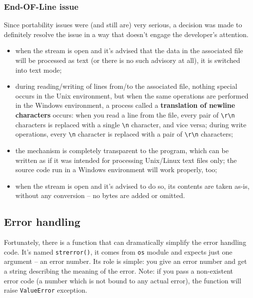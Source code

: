 \documentclass[11pt]{article}
\begin{document}
\subsubsection{End-OF-Line issue}
\label{sec:org79d77e9}
Since portability issues were (and still are) very serious, a decision
was made to definitely resolve the issue in a way that doesn’t engage
the developer’s attention.

\begin{itemize}
\item when the stream is open and it’s advised that the data in the
associated file will be processed as text (or there is no such
advisory at all), it is switched into text mode;

\item during reading/writing of lines from/to the associated file, nothing
special occurs in the Unix environment, but when the same operations
are performed in the Windows environment, a process called a
\textbf{translation of newline characters} occurs: when you read a line from
the file, every pair of \texttt{\textbackslash{}r\textbackslash{}n} characters is replaced with a single \texttt{\textbackslash{}n}
character, and vice versa; during write operations, every \texttt{\textbackslash{}n}
character is replaced with a pair of \texttt{\textbackslash{}r\textbackslash{}n} characters;

\item the mechanism is completely transparent to the program, which can be
written as if it was intended for processing Unix/Linux text files
only; the source code run in a Windows environment will work
properly, too;

\item when the stream is open and it’s advised to do so, its contents are
taken as-is, without any conversion – no bytes are added or omitted.
\end{itemize}




\newpage

\subsection{Error handling}
\label{sec:org736c5a4}
Fortunately, there is a function that can dramatically simplify the
error handling code. It’s named \texttt{strerror()}, it comes from \texttt{os} module
and expects just one argument – an error number.  Its role is simple:
you give an error number and get a string describing the meaning of
the error.  Note: if you pass a non-existent error code (a number
which is not bound to any actual error), the function will raise
\texttt{ValueError} exception.
\end{document}
